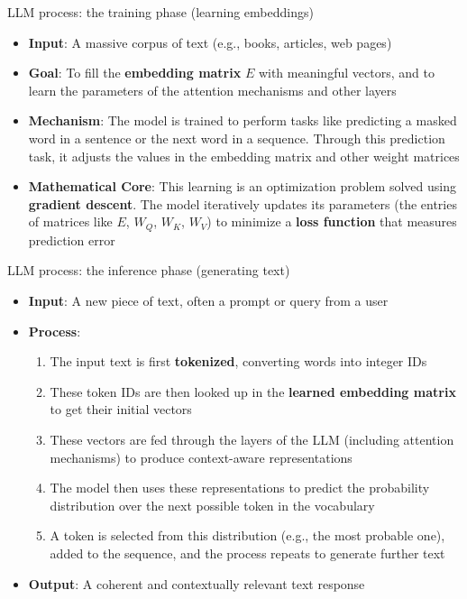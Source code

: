 \documentclass[aspectratio=169]{beamer}\usepackage[]{graphicx}\usepackage[]{xcolor}
\makeatletter
\newcommand{\defword}[1]{\textbf{\textcolor{beamer@blendedblue}{#1}}}
\makeatother
\begin{document}
\begin{frame}{LLM process: the training phase (learning embeddings)}
\begin{itemize}
    \item \textbf{Input}: A massive corpus of text (e.g., books, articles, web pages)
    \vfill
    \item \textbf{Goal}: To fill the \defword{embedding matrix} $E$ with meaningful vectors, and to learn the parameters of the attention mechanisms and other layers
    \vfill
    \item \textbf{Mechanism}: The model is trained to perform tasks like predicting a masked word in a sentence or the next word in a sequence. Through this prediction task, it adjusts the values in the embedding matrix and other weight matrices
    \vfill
    \item \textbf{Mathematical Core}: This learning is an optimization problem solved using \textbf{gradient descent}. The model iteratively updates its parameters (the entries of matrices like $E$, $W_Q$, $W_K$, $W_V$) to minimize a \defword{loss function} that measures prediction error
\end{itemize}
\end{frame}

\begin{frame}{LLM process: the inference phase (generating text)}
\begin{itemize}
    \item \textbf{Input}: A new piece of text, often a prompt or query from a user
    \vfill
    \item \textbf{Process}:
    \begin{enumerate}
        \item The input text is first \defword{tokenized}, converting words into integer IDs
        \vfill
        \item These token IDs are then looked up in the \textbf{learned embedding matrix} to get their initial vectors
        \vfill
        \item These vectors are fed through the layers of the LLM (including attention mechanisms) to produce context-aware representations
        \vfill
        \item The model then uses these representations to predict the probability distribution over the next possible token in the vocabulary
        \vfill
        \item A token is selected from this distribution (e.g., the most probable one), added to the sequence, and the process repeats to generate further text
    \end{enumerate}
    \vfill
    \item \textbf{Output}: A coherent and contextually relevant text response
\end{itemize}
\end{frame}
\end{document}
